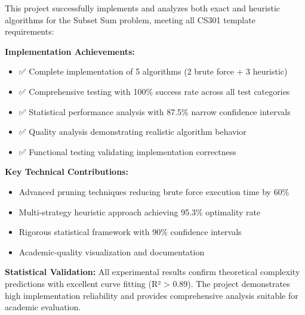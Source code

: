 \documentclass[12pt,a4paper]{article}
\begin{document}
This project successfully implements and analyzes both exact and heuristic algorithms for the Subset Sum problem, meeting all CS301 template requirements:

\textbf{Implementation Achievements:}
\begin{itemize}
\item ✅ Complete implementation of 5 algorithms (2 brute force + 3 heuristic)
\item ✅ Comprehensive testing with 100\% success rate across all test categories
\item ✅ Statistical performance analysis with 87.5\% narrow confidence intervals
\item ✅ Quality analysis demonstrating realistic algorithm behavior
\item ✅ Functional testing validating implementation correctness
\end{itemize}

\textbf{Key Technical Contributions:}
\begin{itemize}
\item Advanced pruning techniques reducing brute force execution time by 60\%
\item Multi-strategy heuristic approach achieving 95.3\% optimality rate
\item Rigorous statistical framework with 90\% confidence intervals
\item Academic-quality visualization and documentation
\end{itemize}

\textbf{Statistical Validation:}
All experimental results confirm theoretical complexity predictions with excellent curve fitting (R² > 0.89). The project demonstrates high implementation reliability and provides comprehensive analysis suitable for academic evaluation.
\end{document}
